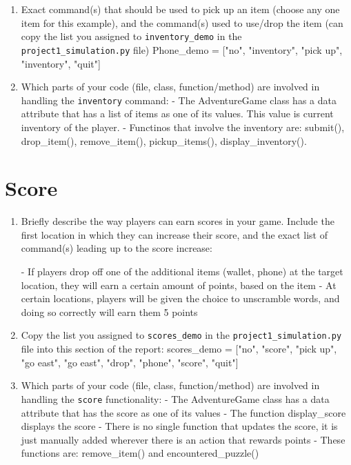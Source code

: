 \documentclass[11pt]{article}
\begin{document}
\begin{enumerate}
    \item Exact command(s) that should be used to pick up an item (choose any one item for this example), and the command(s) used to use/drop the item (can copy the list you assigned to \texttt{inventory\_demo} in the \texttt{project1\_simulation.py} file)
        Phone_demo = ["no", "inventory", "pick up", "inventory", "quit"]
    \item Which parts of your code (file, class, function/method) are involved in handling the \texttt{inventory} command:
        - The AdventureGame class has a data attribute that has a list of items as one of its values. This value is current inventory of the player.
        - Functinos that involve the inventory are: submit(), drop_item(), remove_item(), pickup_items(), display_inventory().
\end{enumerate}

\section*{Score}
\begin{enumerate}

    \item Briefly describe the way players can earn scores in your game. Include the first location in which they can increase their score, and the exact list of command(s) leading up to the score increase:

        - If players drop off one of the additional items (wallet, phone) at the target location, they will earn a certain
        amount of points, based on the item
        - At certain locations, players will be given the choice to unscramble words, and doing so correctly will earn them
        5 points

    \item Copy the list you assigned to \texttt{scores\_demo} in the \texttt{project1\_simulation.py} file into this section of the report:
        scores_demo = ["no", "score", "pick up", "go east", "go east", "drop", "phone", "score", "quit"]

    \item Which parts of your code (file, class, function/method) are involved in handling the \texttt{score} functionality:
        - The AdventureGame class has a data attribute that has the score as one of its values
        - The function display_score displays the score
        - There is no single function that updates the score, it is just manually added wherever there is an action that rewards points
        - These functions are: remove_item() and encountered_puzzle()
\end{enumerate}
\end{document}

